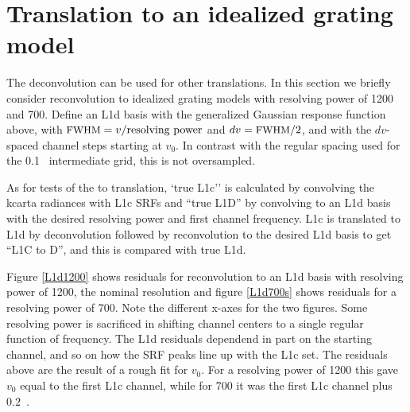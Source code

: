 \documentclass[11pt]{article}
\begin{document}
% 
% 
% 

\FloatBarrier
\section{Translation to an idealized grating model}
\label{airsL1d}

The {\airs} deconvolution can be used for other translations.  In
this section we briefly consider reconvolution to idealized grating
models with resolving power of 1200 and 700.  Define an {\airs} L1d
basis with the generalized Gaussian response function above, with
$\mbox{\small FWHM} = v / \hbox{resolving power}$ and $dv = \mbox{\small FWHM} / 2$, and with
the $dv$-spaced channel steps starting at $v_0$.  In contrast with
the regular spacing used for the {0.1~\wn} intermediate grid, this
is not oversampled.


As for tests of the {\airs} to {\cris} translation, `true L1c'' is
calculated by convolving the kcarta radiances with {\airs} L1c SRFs
and ``true L1D'' by convolving to an L1d basis with the desired
resolving power and first channel frequency.  L1c is translated to
L1d by deconvolution followed by reconvolution to the desired L1d
basis to get ``L1C to D'', and this is compared with true L1d.

Figure \ref{L1d1200} shows residuals for reconvolution to an L1d
basis with resolving power of 1200, the nominal {\airs} resolution
and figure \ref{L1d700s} shows residuals for a resolving power of
700.  Note the different x-axes for the two figures.  Some resolving
power is sacrificed in shifting channel centers to a single regular
function of frequency.  The L1d residuals dependend in part on the
starting channel, and so on how the SRF peaks line up with the L1c
set.  The residuals above are the result of a rough fit for $v_0$.
For a resolving power of 1200 this gave $v_0$ equal to the first L1c
channel, while for 700 it was the first L1c channel plus $0.2$~\wn.
\end{document}
